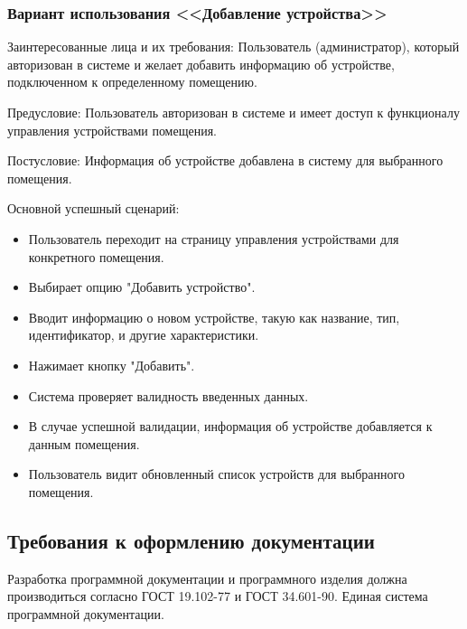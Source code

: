 \subsubsection{Вариант использования <<Добавление устройства>>}

Заинтересованные лица и их требования: Пользователь (администратор), который авторизован в системе и желает добавить информацию об устройстве, подключенном к определенному помещению.

Предусловие: Пользователь авторизован в системе и имеет доступ к функционалу управления устройствами помещения.

Постусловие: Информация об устройстве добавлена в систему для выбранного помещения.

Основной успешный сценарий:
\begin{itemize}
	\item Пользователь переходит на страницу управления устройствами для конкретного помещения.
	\item Выбирает опцию "Добавить устройство".
	\item Вводит информацию о новом устройстве, такую как название, тип, идентификатор, и другие характеристики.
	\item Нажимает кнопку "Добавить".
	\item Система проверяет валидность введенных данных.
	\item В случае успешной валидации, информация об устройстве добавляется к данным помещения.
	\item Пользователь видит обновленный список устройств для выбранного помещения.
\end{itemize}

\subsection{Требования к оформлению документации}

Разработка программной документации и программного изделия должна производиться согласно ГОСТ 19.102-77 и ГОСТ 34.601-90. Единая система программной документации.
